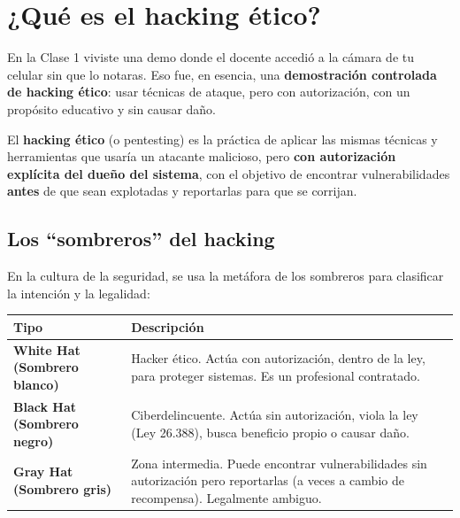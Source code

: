 \documentclass[12pt,a4paper]{article}
\renewcommand{\arraystretch}{1.25}
\begin{document}
\tableofcontents
\newpage

\section{¿Qu\'e es el hacking \'etico?}

En la Clase 1 viviste una demo donde el docente accedi\'o a la c\'amara de tu celular sin que lo notaras. Eso fue, en esencia, una \textbf{demostraci\'on controlada de hacking \'etico}: usar t\'ecnicas de ataque, pero con autorizaci\'on, con un prop\'osito educativo y sin causar da\~no.

\begin{cajaDefinicion}
El \textbf{hacking \'etico} (o pentesting) es la pr\'actica de aplicar las mismas t\'ecnicas y herramientas que usar\'ia un atacante malicioso, pero \textbf{con autorizaci\'on expl\'icita del due\~no del sistema}, con el objetivo de encontrar vulnerabilidades \textbf{antes} de que sean explotadas y reportarlas para que se corrijan.
\end{cajaDefinicion}

\subsection{Los ``sombreros'' del hacking}
En la cultura de la seguridad, se usa la met\'afora de los sombreros para clasificar la intenci\'on y la legalidad:

\renewcommand{\arraystretch}{1.6}
\begin{tabularx}{\textwidth}{|>{\bfseries}p{3cm}|X|}
\hline
\rowcolor{grisClaro}
\textbf{Tipo} & \textbf{Descripci\'on} \\
\hline
\textbf{White Hat} (Sombrero blanco) & Hacker \'etico. Act\'ua con autorizaci\'on, dentro de la ley, para proteger sistemas. Es un profesional contratado. \\
\hline
\textbf{Black Hat} (Sombrero negro) & Ciberdelincuente. Act\'ua sin autorizaci\'on, viola la ley (Ley 26.388), busca beneficio propio o causar da\~no. \\
\hline
\textbf{Gray Hat} (Sombrero gris) & Zona intermedia. Puede encontrar vulnerabilidades sin autorizaci\'on pero reportarlas (a veces a cambio de recompensa). Legalmente ambiguo. \\
\hline
\end{tabularx}
\end{document}
